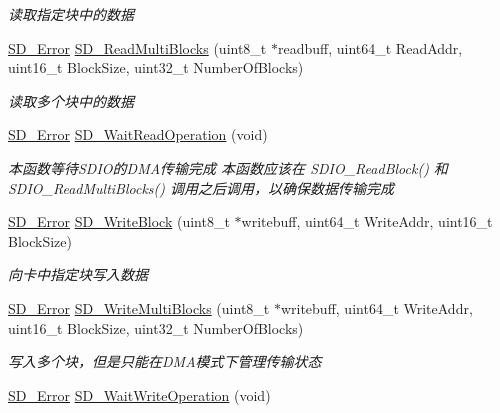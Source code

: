 \begin{DoxyCompactItemize}
\begin{DoxyCompactList}\small\item\em 读取指定块中的数据 \end{DoxyCompactList}\item 
\hyperlink{group__sd__card_gacff91fa68daa1d1ee967b5b3fb3dbd8c}{S\+D\+\_\+\+Error} \hyperlink{group__sd__card__private_ga56b7336165f2631d9142a513ea2d0d17}{S\+D\+\_\+\+Read\+Multi\+Blocks} (uint8\+\_\+t $\ast$readbuff, uint64\+\_\+t Read\+Addr, uint16\+\_\+t Block\+Size, uint32\+\_\+t Number\+Of\+Blocks)
\begin{DoxyCompactList}\small\item\em 读取多个块中的数据 \end{DoxyCompactList}\item 
\hyperlink{group__sd__card_gacff91fa68daa1d1ee967b5b3fb3dbd8c}{S\+D\+\_\+\+Error} \hyperlink{group__sd__card__private_ga42ab410b834d74d7f3ee757dc888b8cc}{S\+D\+\_\+\+Wait\+Read\+Operation} (void)
\begin{DoxyCompactList}\small\item\em 本函数等待\+S\+D\+I\+O的\+D\+M\+A传输完成 本函数应该在 S\+D\+I\+O\+\_\+\+Read\+Block() 和 S\+D\+I\+O\+\_\+\+Read\+Multi\+Blocks() 调用之后调用，以确保数据传输完成 \end{DoxyCompactList}\item 
\hyperlink{group__sd__card_gacff91fa68daa1d1ee967b5b3fb3dbd8c}{S\+D\+\_\+\+Error} \hyperlink{group__sd__card__private_gab1eef7c1ff23ea746db504463d301a8b}{S\+D\+\_\+\+Write\+Block} (uint8\+\_\+t $\ast$writebuff, uint64\+\_\+t Write\+Addr, uint16\+\_\+t Block\+Size)
\begin{DoxyCompactList}\small\item\em 向卡中指定块写入数据 \end{DoxyCompactList}\item 
\hyperlink{group__sd__card_gacff91fa68daa1d1ee967b5b3fb3dbd8c}{S\+D\+\_\+\+Error} \hyperlink{group__sd__card__private_ga64baac72a75a2c522e837935009cbe93}{S\+D\+\_\+\+Write\+Multi\+Blocks} (uint8\+\_\+t $\ast$writebuff, uint64\+\_\+t Write\+Addr, uint16\+\_\+t Block\+Size, uint32\+\_\+t Number\+Of\+Blocks)
\begin{DoxyCompactList}\small\item\em 写入多个块，但是只能在\+D\+M\+A模式下管理传输状态 \end{DoxyCompactList}\item 
\hyperlink{group__sd__card_gacff91fa68daa1d1ee967b5b3fb3dbd8c}{S\+D\+\_\+\+Error} \hyperlink{group__sd__card__private_gad55967ea67075f01671fb2144c7f7b0d}{S\+D\+\_\+\+Wait\+Write\+Operation} (void)

\end{DoxyCompactItemize}
